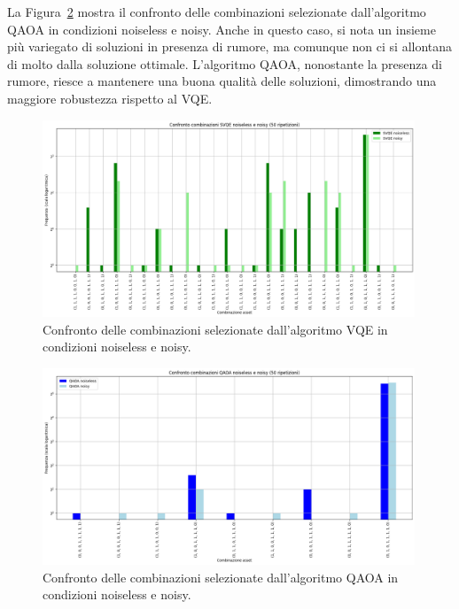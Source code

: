 La Figura~\ref{fig:confronto-qaoa-noiseless-noisy} mostra il confronto delle combinazioni selezionate 
dall'algoritmo QAOA in condizioni noiseless e noisy. Anche in questo caso, si nota un 
insieme più variegato di soluzioni in presenza di rumore, ma comunque non ci si 
allontana di molto dalla soluzione ottimale. L'algoritmo QAOA, nonostante la presenza 
di rumore, riesce a mantenere una buona qualità delle soluzioni, dimostrando una 
maggiore robustezza rispetto al VQE.

\begin{figure}[ht!]
    \centering
    \includegraphics[width=0.99\textwidth]{images/risultati/confronto-svqe.png}
    \caption{Confronto delle combinazioni selezionate dall'algoritmo VQE in condizioni noiseless e noisy.}
    \label{fig:confronto-svqe-noiseless-noisy}
\end{figure}

\begin{figure}[ht!]
    \centering
    \includegraphics[width=0.99\textwidth]{images/risultati/confronto-qaoa.png}
    \caption{Confronto delle combinazioni selezionate dall'algoritmo QAOA in condizioni noiseless e noisy.}
    \label{fig:confronto-qaoa-noiseless-noisy}
\end{figure}


